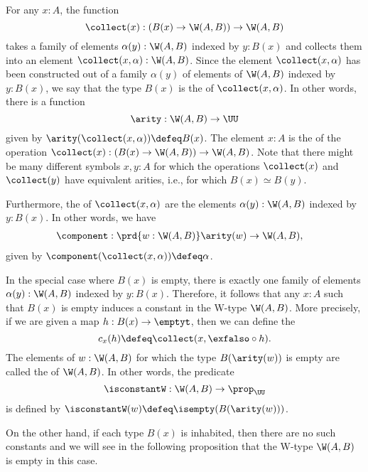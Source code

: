 \begin{rmk}\label{rmk:constant-W}
  For any $x:A$, the function
  \begin{equation*}
    \collect(x):(B(x)\to\W(A,B))\to\W(A,B)
  \end{equation*}
  takes a family of elements $\alpha(y):\W(A,B)$ indexed by $y:B(x)$ and collects them into an element $\collect(x,\alpha):\W(A,B)$. Since the element $\collect(x,\alpha)$ has been constructed out of a family $\alpha(y)$ of elements of $\W(A,B)$ indexed by $y:B(x)$, we say that the type $B(x)$ is the  of $\collect(x,\alpha)$. In other words, there is a function
  \begin{equation*}
    \arity : \W(A,B)\to\UU
  \end{equation*}
  given by $\arity(\collect(x,\alpha))\defeq B(x)$. The element $x:A$ is the  of the operation $\collect(x):(B(x)\to\W(A,B))\to\W(A,B)$. Note that there might be many different symbols $x,y:A$ for which the operations $\collect(x)$ and $\collect(y)$ have equivalent arities, i.e., for which $B(x)\simeq B(y)$.

  Furthermore, the  of $\collect(x,\alpha)$ are the elements $\alpha(y):\W(A,B)$ indexed by $y:B(x)$. In other words, we have
  \begin{align*}
    \component & : \prd{w:\W(A,B)} \arity(w) \to \W(A,B),
  \end{align*}
  given by $\component(\collect(x,\alpha))\defeq\alpha$.
  
  In the special case where $B(x)$ is empty, there is exactly one family of elements $\alpha(y):\W(A,B)$ indexed by $y:B(x)$. Therefore, it follows that any $x:A$ such that $B(x)$ is empty induces a constant in the W-type $\W(A,B)$. More precisely, if we are given a map $h:B(x)\to \emptyt$, then we can define the 
  \begin{equation*}
    c_x(h)\defeq \collect(x,\exfalso\circ h).
  \end{equation*}
  The elements of $w:\W(A,B)$ for which the type $B(\arity(w))$ is empty are called the  of $\W(A,B)$. In other words, the predicate
  \begin{equation*}
    \isconstantW : \W(A,B)\to\prop_\UU
  \end{equation*}
  is defined by $\isconstantW(w)\defeq\isempty(B(\arity(w)))$.
  
  On the other hand, if each type $B(x)$ is inhabited, then there are no such constants and we will see in the following proposition that the W-type $\W(A,B)$ is empty in this case.  
\end{rmk}

